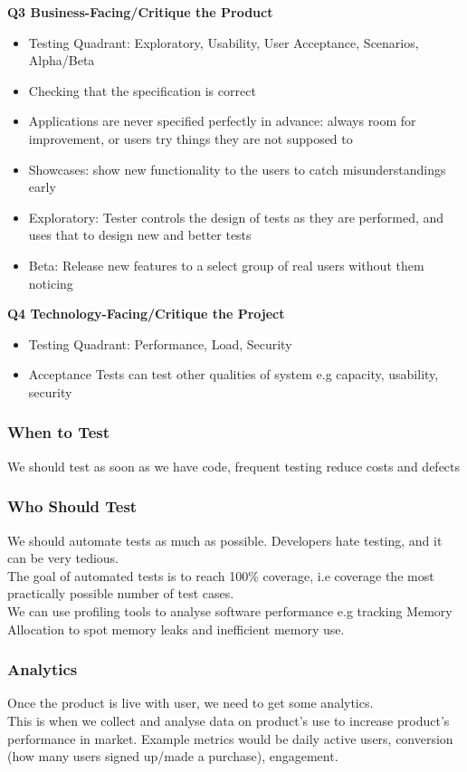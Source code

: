 \documentclass{article}
\begin{document}
\textbf{Q3 Business-Facing/Critique the Product}
\begin{itemize}
    \item Testing Quadrant: Exploratory, Usability, User Acceptance, Scenarios, Alpha/Beta
    \item Checking that the specification is correct
    \item Applications are never specified perfectly in advance: always room for improvement, or users try things they are not supposed to
    \item Showcases: show new functionality to the users to catch misunderstandings early
    \item Exploratory: Tester controls the design of tests as they are performed, and uses that to design new and better tests
    \item Beta: Release new features to a select group of real users without them noticing
\end{itemize}
\textbf{Q4 Technology-Facing/Critique the Project} 
\begin{itemize}
    \item Testing Quadrant: Performance, Load, Security
    \item Acceptance Tests can test other qualities of system e.g capacity, usability, security
\end{itemize}
\subsubsection{When to Test}
We should test as soon as we have code, frequent testing reduce costs and defects
\subsubsection{Who Should Test}
We should automate tests as much as possible. Developers hate testing, and it can be very tedious. \\
The goal of automated tests is to reach 100\% coverage, i.e coverage the most practically possible number of test cases. \\
We can use profiling tools to analyse software performance e.g tracking Memory Allocation to spot memory leaks and inefficient memory use.
\subsubsection{Analytics}
Once the product is live with user, we need to get some analytics. \\
This is when we collect and analyse data on product's use to increase product's performance in market. Example metrics would be daily active users, conversion (how many users signed up/made a purchase), engagement.
\end{document}

